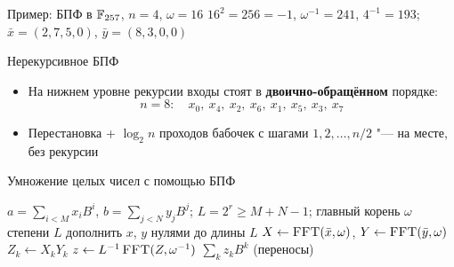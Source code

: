\documentclass{ca-slides}
\begin{document}
\begin{canvasframe}{Пример: БПФ в $\mathbb{F}_{257}$, $n = 4$, $\omega = 16$}
  $16^2 = 256 = -1$, \quad $\omega^{-1} = 241$, \quad $4^{-1} = 193$;\quad
  $\bar x = (2, 7, 5, 0)$, $\bar y = (8, 3, 0, 0)$
  \begin{center}
  \end{center}
  \penspace[0.2\textheight]
\end{canvasframe}

\begin{canvasframe}{Нерекурсивное БПФ}
  \begin{itemize}
    \item На нижнем уровне рекурсии входы стоят в \textbf{двоично-обращённом} порядке:
      \[ n = 8:\quad x_0,\ x_4,\ x_2,\ x_6,\ x_1,\ x_5,\ x_3,\ x_7 \]
    \item Перестановка + $\log_2 n$ проходов бабочек с шагами $1, 2, \dots, n/2$ "--- на месте,
      без рекурсии
  \end{itemize}
  \penspace[0.2\textheight]
\end{canvasframe}

\begin{canvasframe}{Умножение целых чисел с помощью БПФ}
  \begin{algorithmic}[1]
    \Require $a = \sum_{i<M} x_i B^i$, $b = \sum_{j<N} y_j B^j$; $L = 2^r \ge M + N - 1$;
      главный корень $\omega$ степени $L$
    \State дополнить $x$, $y$ нулями до длины $L$
    \State $X \gets \Call{FFT}{\bar x, \omega}$, $Y \gets \Call{FFT}{\bar y, \omega}$
    \State $Z_k \gets X_k Y_k$
    \State $z \gets L^{-1}\,\Call{FFT}{Z, \omega^{-1}}$ 
    \State \Return $\sum_k z_k B^k$ (переносы)
  \end{algorithmic}
\end{canvasframe}
\end{document}
